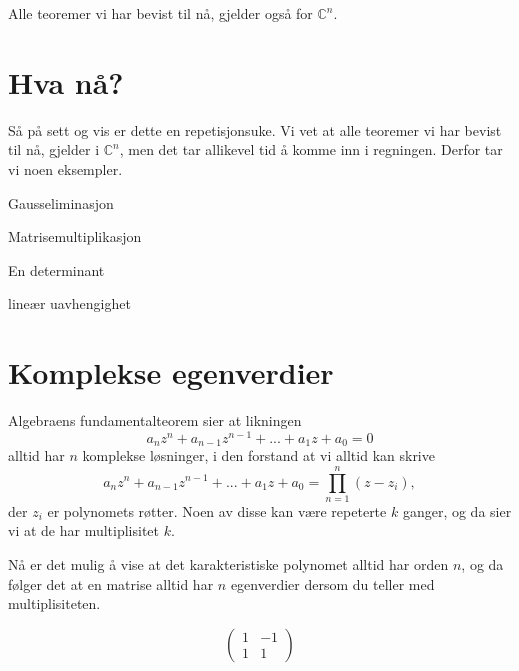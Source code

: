 \begin{thm}
Alle teoremer vi har bevist til nå, gjelder også for $\mathbb C^n$. 
\end{thm}




\section*{Hva nå?}
Så på sett og vis er dette en repetisjonsuke. 
Vi vet at alle teoremer vi har bevist til nå, gjelder i $\mathbb C^n$, 
men det tar allikevel tid å komme inn i regningen. Derfor tar vi noen eksempler.

\begin{ex}
Gausseliminasjon
\end{ex}

\begin{ex}
Matrisemultiplikasjon
\end{ex}

\begin{ex}
En determinant
\end{ex}

\begin{ex}
lineær uavhengighet
\end{ex}






\section*{Komplekse egenverdier}
Algebraens fundamentalteorem sier at likningen
\[
a_nz^n+a_{n-1}z^{n-1}+...+a_1z+a_0=0
\]
alltid har $n$ komplekse løsninger, i den forstand at vi alltid kan skrive
\[
a_nz^n+a_{n-1}z^{n-1}+...+a_1z+a_0=\prod_{n=1}^n (z-z_i),
\]
der $z_i$ er polynomets røtter. Noen av disse kan være repeterte $k$ ganger, og da sier vi at de har multiplisitet $k$. 

Nå er det mulig å vise at det karakteristiske polynomet alltid har orden $n$, 
og da følger det at en matrise alltid har $n$ egenverdier dersom du 
teller med multiplisiteten. 

\begin{ex}
\[
\begin{pmatrix}
1 & -1 \\ 1 &1
\end{pmatrix}
\]
\end{ex}



\kapittelslutt
